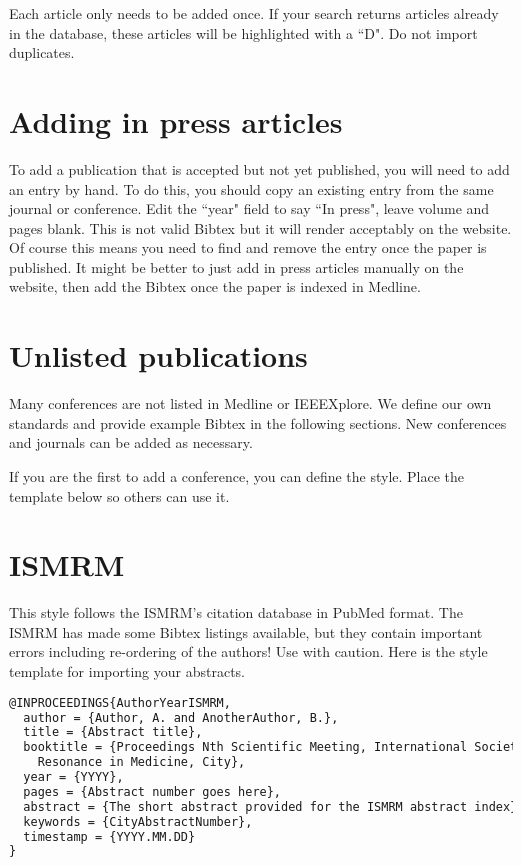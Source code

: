 \documentclass{InsightArticle}
\begin{document}
Each article only needs to be added once. If your search returns articles already in the database, these articles will be highlighted with a ``D". Do not import duplicates.


\section{Adding in press articles}

To add a publication that is accepted but not yet published, you will need to add an entry by hand. To do this, you should copy an existing entry from the same journal or conference. Edit the ``year" field to say ``In press", leave volume and pages blank. This is not valid Bibtex but it will render acceptably on the website. Of course this means you need to find and remove the entry once the paper is published. It might be better to just add in press articles manually on the website, then add the Bibtex once the paper is indexed in Medline. 


\section{Unlisted publications}

Many conferences are not listed in Medline or IEEEXplore.  We define our own standards and provide example Bibtex in the following sections. New conferences and journals can be added as necessary. 

If you are the first to add a conference, you can define the style. Place the template below so others can use it. 

\section{ISMRM}

This style follows the ISMRM's citation database in PubMed format. The ISMRM has made some Bibtex listings available, but they contain important errors including re-ordering of the authors! Use with caution. Here is the style template for importing your abstracts.

\begin{lstlisting}[language=TeX]
@INPROCEEDINGS{AuthorYearISMRM,
  author = {Author, A. and AnotherAuthor, B.},
  title = {Abstract title},
  booktitle = {Proceedings Nth Scientific Meeting, International Society for Magnetic
	Resonance in Medicine, City},
  year = {YYYY},
  pages = {Abstract number goes here},
  abstract = {The short abstract provided for the ISMRM abstract index},
  keywords = {CityAbstractNumber},
  timestamp = {YYYY.MM.DD}
}
\end{lstlisting}





\end{document}
